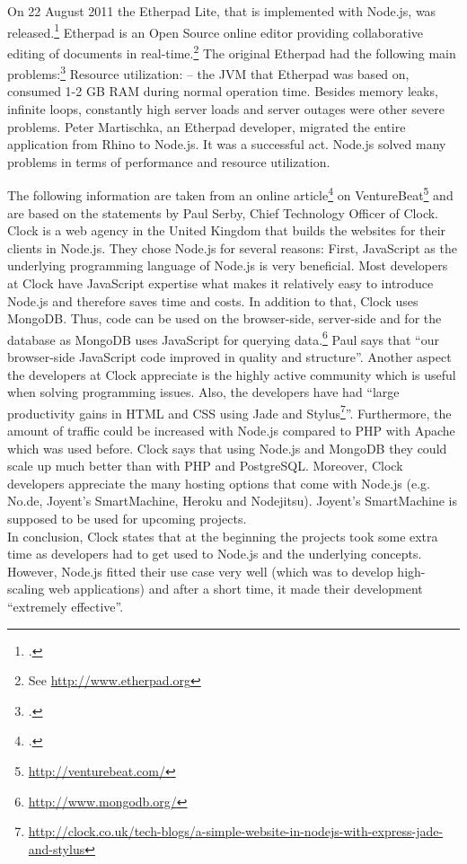 \begin{appendices}
\begin{subappendices}
\newpage
{}
\label{app:etherpad}
On 22 August 2011 the Etherpad Lite, that is implemented with Node.js, was released.\footcite[Cf.][]{Martischka_2011}  Etherpad is an Open Source online editor providing collaborative editing of documents in real-time.\footnote{See \url{http://www.etherpad.org}} The original Etherpad had the following main problems:\footcite[Cf.][]{Martischka_2011} Resource utilization: – the JVM that Etherpad was based on, consumed 1-2 GB RAM during normal operation time. Besides memory leaks, infinite loops, constantly high server loads and server outages were other severe problems.
Peter Martischka, an Etherpad developer, migrated the entire application from Rhino to Node.js. It was a successful act. Node.js solved many problems in terms of performance and resource utilization. 
\newpage
{}
\label{app:case_clock}

The following information are taken from an online article\footcite[Cf.][]{serby_2012} on VentureBeat\footnote{\url{http://venturebeat.com/}} and are based on the statements by Paul Serby, Chief Technology Officer of Clock.
Clock is a web agency in the United Kingdom that builds the websites for their clients in Node.js. They chose Node.js for several reasons:
First, JavaScript as the underlying programming language of Node.js is very beneficial. Most developers at Clock have JavaScript expertise what makes it relatively easy to introduce Node.js and therefore saves time and costs. In addition to that, Clock uses MongoDB. Thus, code can be used on the browser-side, server-side and for the database as MongoDB uses JavaScript for querying data.\footnote{\url{http://www.mongodb.org/}}
Paul says that “our browser-side JavaScript code improved in quality and structure”. Another aspect the developers at Clock appreciate is the highly active community which is useful when solving programming issues. Also, the developers have had “large productivity gains in HTML and CSS using Jade and Stylus\footnote{\url{http://clock.co.uk/tech-blogs/a-simple-website-in-nodejs-with-express-jade-and-stylus}}”.
Furthermore, the amount of traffic could be increased with Node.js compared to PHP with Apache which was used before. Clock says that using Node.js and MongoDB they could scale up much better than with PHP and PostgreSQL. Moreover, Clock developers appreciate the many hosting options that come with Node.js (e.g. No.de, Joyent’s SmartMachine, Heroku and Nodejitsu). Joyent’s SmartMachine is supposed to be used for upcoming projects.\\
In conclusion, Clock states that at the beginning the projects took some extra time as developers had to get used to Node.js and the underlying concepts. However, Node.js fitted their use case very well (which was to develop high-scaling web applications) and after a short time, it made their development “extremely effective”.




\end{subappendices}
\end{appendices}
